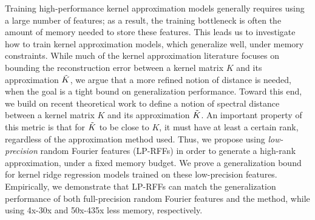 
Training high-performance kernel approximation models generally requires using a large number of features; as a result, the training bottleneck is often the amount of memory needed to store these features. This leads us to investigate how to train kernel approximation models, which generalize well, under memory constraints. While much of the kernel approximation literature focuses on bounding the reconstruction error between a kernel matrix $K$ and its approximation $\tilde{K}$, we argue that a more refined notion of distance is needed, when the goal is a tight bound on generalization performance.  Toward this end, we build on recent theoretical work \citep{avron17,musco17} to define a notion of spectral distance between a kernel matrix $K$ and its approximation $\tilde{K}$. An important property of this metric is that for $\tilde{K}$ to be close to $K$, it must have at least a certain rank, regardless of the approximation method used. Thus, we propose using \emph{low-precision} random Fourier features (LP-RFFs) in order to generate a high-rank approximation, under a fixed memory budget. We prove a generalization bound for kernel ridge regression models trained on these low-precision features.  Empirically, we demonstrate that LP-RFFs can match the generalization performance of both full-precision random Fourier features and the \Nystrom method, while using 4x-30x and 50x-435x less memory, respectively.
